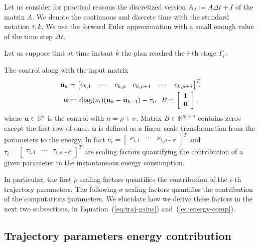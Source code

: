 \documentclass[letterpaper,10pt,conference]{ieeeconf}
\theoremstyle{definition}
\begin{document}
Let us consider for practical reasons the discretized version $A_d:=A\Delta t+I$ of the matrix $A$. We denote the continuous and discrete time with the standard notation $t,k$. We use the forward Euler approximation with a small enough value of the time step $\Delta t$.

Let us suppose that at time instant $k$ the plan reached the $i$-th stage $\Gamma_i$.

The control along with the input matrix
\begin{equation}\label{eq:state-control}\begin{split}
  \mathbf{u}_k&=\begin{bmatrix}c_{k,1} & \cdots & c_{k,\rho} & c_{k,\rho+1} & \cdots & c_{k,\rho+\sigma}\end{bmatrix}^T\hspace*{-1ex},\\
  \mathbf{u}&:=\mathrm{diag}(\nu_i)(\mathbf{u}_k-\mathbf{u}_{k-1})-\tau_i,\,\,\,B=\left[\begin{array}{c} \mathbf{1}\\\mathbf{0}\end{array}\right],
\end{split}\end{equation}
where $\mathbf{u}\in\mathbb{R}^n$ is the control with $n=\rho+\sigma$. Matrix $B\in\mathbb{R}^{m\times n}$ contains zeros except the first row of ones. $\mathbf{u}$ is defined as a linear scale transformation from the parameters to the energy. In fact $\nu_i=\begin{bmatrix}\nu_{i,1} & \cdots & \nu_{i,\rho+\sigma}\end{bmatrix}^T$ and $\tau_i=\begin{bmatrix}\tau_{i,1} & \cdots & \tau_{i,\rho+\sigma}\end{bmatrix}^T$ are scaling factors quantifying the contribution of a given parameter to the instantaneous energy consumption. 

In particular, the first $\rho$ scaling factors quantifies the contribution of the $i$-th trajectory parameters. The following $\sigma$ scaling factors quantifies the contribution of the computations parameters. We elucidate how we derive these factors in the next two subsections, in Equation~(\ref{eq:traj-gains}) and~(\ref{eq:energy-comp}).

\subsection{Trajectory parameters energy contribution}
\label{sec:model}
\end{document}
